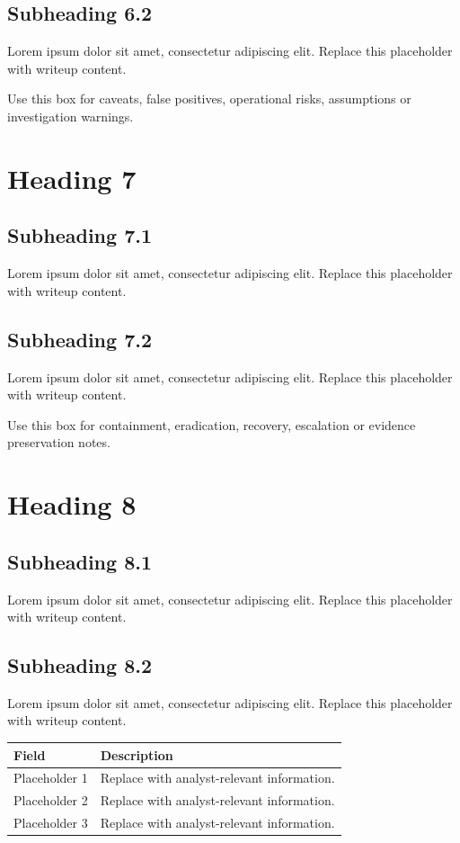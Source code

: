 \documentclass[11pt,a4paper]{article}
\let\oldsection\section
\renewcommand{\section}{\clearpage\oldsection}
\newcommand{\placeholder}{\textcolor{muted}{Lorem ipsum dolor sit amet, consectetur adipiscing elit. Replace this placeholder with writeup content.}}
\begin{document}
\subsection{Subheading 6.2}

\placeholder

\begin{warningbox}
Use this box for caveats, false positives, operational risks, assumptions or investigation warnings.
\end{warningbox}

\section{Heading 7}

\subsection{Subheading 7.1}

\placeholder

\subsection{Subheading 7.2}

\placeholder

\begin{irbox}
Use this box for containment, eradication, recovery, escalation or evidence preservation notes.
\end{irbox}

\section{Heading 8}

\subsection{Subheading 8.1}

\placeholder

\subsection{Subheading 8.2}

\placeholder

\begin{longtable}{>{\raggedright\arraybackslash}p{} >{\raggedright\arraybackslash}p{}}
\toprule
\textcolor{primary}{\textbf{Field}} & \textcolor{primary}{\textbf{Description}} \\
\midrule
Placeholder 1 & Replace with analyst-relevant information. \\
Placeholder 2 & Replace with analyst-relevant information. \\
Placeholder 3 & Replace with analyst-relevant information. \\
\bottomrule
\end{longtable}
\end{document}
